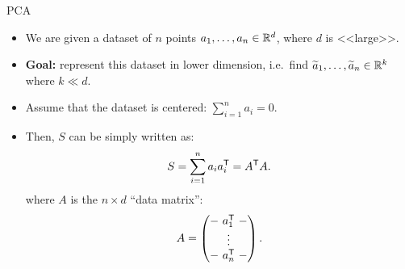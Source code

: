 \documentclass{beamer}
\begin{document}
\begin{frame}[t]{PCA}
	\grid

	\begin{itemize}
		\item We are given a dataset of $n$ points $a_1, \dots, a_n \in \mathbb{R}^d$, where $d$ is <<large>>.
			\vspace{0.1cm}
		\item \textbf{Goal:} represent this dataset in lower dimension, i.e.\ find $\widetilde{a}_1, \dots, \widetilde{a}_n \in \mathbb{R}^k$ where $k \ll d$.
			\vspace{0.1cm}
		\item Assume that the dataset is centered: $\sum_{i=1}^n a_i = 0$.
			\vspace{0.1cm}
		\item Then, $S$ can be simply written as:
			$$
			S = \sum_{i=1}^n a_i a_i^{{\sf T}}
			= A^{{\sf T}} A.
			$$
			where $A$ is the $n\times d$ ``data matrix'':
			$$
			A =
			\begin{pmatrix}
				- \ a_1^{{\sf T}} \ - \\
				\vdots  \\
				- \ a_n^{{\sf T}} \ -
			\end{pmatrix}
			.
			$$
	\end{itemize}
\end{frame}
\end{document}
